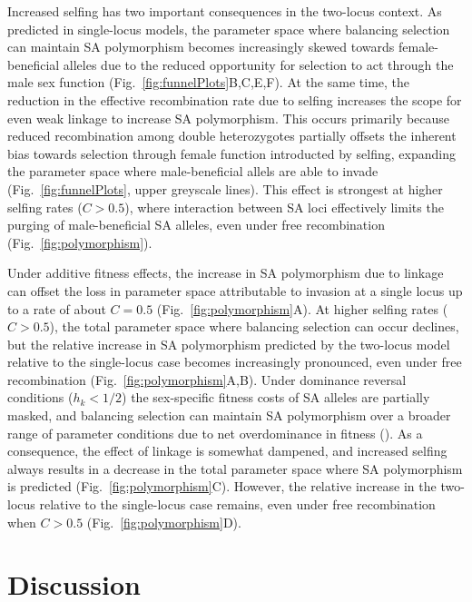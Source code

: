 \documentclass{article}
\begin{document}
Increased selfing has two important consequences in the two-locus context. As predicted in single-locus models, the parameter space where balancing selection can maintain SA polymorphism becomes increasingly skewed towards female-beneficial alleles due to the reduced opportunity for selection to act through the male sex function (Fig.~\ref{fig:funnelPlots}B,C,E,F). At the same time, the reduction in the effective recombination rate due to selfing increases the scope for even weak linkage to increase SA polymorphism. This occurs primarily because reduced recombination among double heterozygotes partially offsets the inherent bias towards selection through female function introducted by selfing, expanding the parameter space where male-beneficial allels are able to invade (Fig.~\ref{fig:funnelPlots}, upper greyscale lines). This effect is strongest at higher selfing rates ($C > 0.5$), where interaction between SA loci effectively limits the purging of male-beneficial SA alleles, even under free recombination (Fig.~\ref{fig:polymorphism}). 

Under additive fitness effects, the increase in SA polymorphism due to linkage can offset the loss in parameter space attributable to invasion at a single locus up to a rate of about $C = 0.5$ (Fig.~\ref{fig:polymorphism}A). At higher selfing rates ($C > 0.5$), the total parameter space where balancing selection can occur declines, but the relative increase in SA polymorphism predicted by the two-locus model relative to the single-locus case becomes increasingly pronounced, even under free recombination (Fig.~\ref{fig:polymorphism}A,B). Under dominance reversal conditions ($h_k < 1/2$) the sex-specific fitness costs of SA alleles are partially masked, and balancing selection can maintain SA polymorphism over a broader range of parameter conditions due to net overdominance in fitness (\citealt{ConnClark2012, ConnClark2014}). As a consequence, the effect of linkage is somewhat dampened, and increased selfing always results in a decrease in the total parameter space where SA polymorphism is predicted (Fig.~\ref{fig:polymorphism}C). However, the relative increase in the two-locus relative to the single-locus case remains, even under free recombination when $C > 0.5$ (Fig.~\ref{fig:polymorphism}D).



\section*{Discussion}
\end{document}
